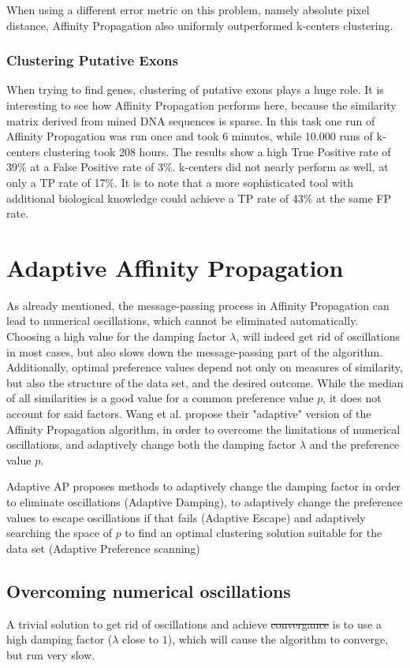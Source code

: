 \documentclass[11pt,a4paper]{article}
\providecommand{\DIFadd}[1]{{\protect\color{blue}\uwave{#1}}} %
\providecommand{\DIFdel}[1]{{\protect\color{red}\sout{#1}}}                      %
\providecommand{\DIFaddbegin}{} %
\providecommand{\DIFaddend}{} %
\providecommand{\DIFdelbegin}{} %
\providecommand{\DIFdelend}{} %
\newcommand{\DIFscaledelfig}{0.5}
\newlength{\DIFdelgraphicswidth} %
\newlength{\DIFdelgraphicsheight} %
\newcommand{\DIFaddincludegraphics}[2][]{{\color{blue}\fbox{\DIFOincludegraphics[#1]{#2}}}} %
\newcommand{\DIFdelincludegraphics}[2][]{%
\sbox{\DIFdelgraphicsbox}{\DIFOincludegraphics[#1]{#2}}%
\settoboxwidth{\DIFdelgraphicswidth}{\DIFdelgraphicsbox} %
\settoboxtotalheight{\DIFdelgraphicsheight}{\DIFdelgraphicsbox} %
\scalebox{\DIFscaledelfig}{%
\parbox[b]{\DIFdelgraphicswidth}{\usebox{\DIFdelgraphicsbox}\\[-\baselineskip] \rule{\DIFdelgraphicswidth}{0em}}\llap{\resizebox{\DIFdelgraphicswidth}{\DIFdelgraphicsheight}{%
\setlength{\unitlength}{\DIFdelgraphicswidth}%
\begin{picture}(1,1)%
\thicklines\linethickness{2pt} %
{\color[rgb]{1,0,0}\put(0,0){\framebox(1,1){}}}%
{\color[rgb]{1,0,0}\put(0,0){\line( 1,1){1}}}%
{\color[rgb]{1,0,0}\put(0,1){\line(1,-1){1}}}%
\end{picture}%
}\hspace*{3pt}}} %
} %
\DeclareRobustCommand{\DIFaddbegin}{\DIFOaddbegin \let\includegraphics\DIFaddincludegraphics} %
\DeclareRobustCommand{\DIFaddend}{\DIFOaddend \let\includegraphics\DIFOincludegraphics} %
\DeclareRobustCommand{\DIFdelbegin}{\DIFOdelbegin \let\includegraphics\DIFdelincludegraphics} %
\DeclareRobustCommand{\DIFdelend}{\DIFOaddend \let\includegraphics\DIFOincludegraphics} %
\begin{document}
When using a different error metric on this problem, namely absolute pixel distance, Affinity Propagation also uniformly outperformed k-centers clustering. \cite{frey2007clustering}
\subsubsection{Clustering Putative Exons}
When trying to find genes, clustering of putative exons plays a huge role. \cite{frey2007clustering} It is interesting to see how Affinity Propagation performs here, because the similarity matrix derived from mined DNA sequences is sparse. In this task one run of Affinity Propagation was run once and took 6 minutes, while 10.000 runs of k-centers clustering took 208 hours. The results show a high True Positive rate of 39\% at a False Positive rate of 3\%. k-centers did not nearly perform as well, at only a TP rate of 17\%. It is to note that a more sophisticated tool with additional biological knowledge could achieve a TP rate of 43\% at the same FP rate. \cite{frey2007clustering}
\pagebreak
\section{Adaptive Affinity Propagation}
As already mentioned, the message-passing process in Affinity Propagation can lead to numerical oscillations, which cannot be eliminated automatically. Choosing a high value for the damping factor $\lambda$, will indeed get rid of oscillations in most cases, but also slows down the message-passing part of the algorithm. Additionally, optimal preference values depend not only on measures of similarity, but also the structure of the data set, and the desired outcome. While the median of all similarities is a good value for a common preference value $p$, it does not account for said factors. Wang et al. propose their "adaptive" version of the Affinity Propagation algorithm, in order to overcome the limitations of numerical oscillations, and adaptively change both the damping factor $\lambda$ and the preference value $p$. \cite{wang2008adaptive}

Adaptive AP proposes methods to adaptively change the damping factor in order to eliminate oscillations (Adaptive Damping), to adaptively change the preference values to escape oscillations if that fails (Adaptive Escape) and adaptively searching the space of $p$ to find an optimal clustering solution suitable for the data set (Adaptive Preference scanning)
\subsection{Overcoming numerical oscillations}
A trivial solution to get rid of oscillations and achieve \DIFdelbegin \DIFdel{convergance }\DIFdelend \DIFaddbegin \DIFadd{convergence }\DIFaddend is to use a high damping factor ($\lambda$ close to $1$), which will cause the algorithm to converge, but run very slow. \cite{wang2008adaptive}
\end{document}
